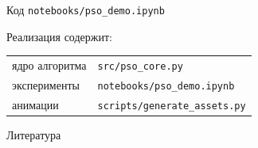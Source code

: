 \documentclass[aspectratio=169,11pt]{beamer}
\begin{document}
\begin{frame}{Код}
    \centering
    \Large
    \texttt{notebooks/pso\_demo.ipynb}
    \vspace{0.5cm}

    \normalsize
    Реализация содержит:
    \vspace{0.2cm}

    \begin{tabular}{ll}
        ядро алгоритма & \texttt{src/pso\_core.py}\\
        эксперименты & \texttt{notebooks/pso\_demo.ipynb}\\
        анимации & \texttt{scripts/generate\_assets.py}\\
    \end{tabular}
\end{frame}

\begin{frame}[allowframebreaks]{Литература}
    \tiny
    \printbibliography
\end{frame}
\end{document}
